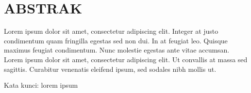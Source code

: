 \clearpage
\chapter*{ABSTRAK}


Lorem ipsum dolor sit amet, consectetur adipiscing elit. Integer at justo condimentum quam fringilla egestas sed non dui. In at feugiat leo. Quisque maximus feugiat condimentum. Nunc molestie egestas ante vitae accumsan. Lorem ipsum dolor sit amet, consectetur adipiscing elit. Ut convallis at massa sed sagittis. Curabitur venenatis eleifend ipsum, sed sodales nibh mollis ut.


\vspace{15mm}
Kata kunci: lorem ipsum
\clearpage
